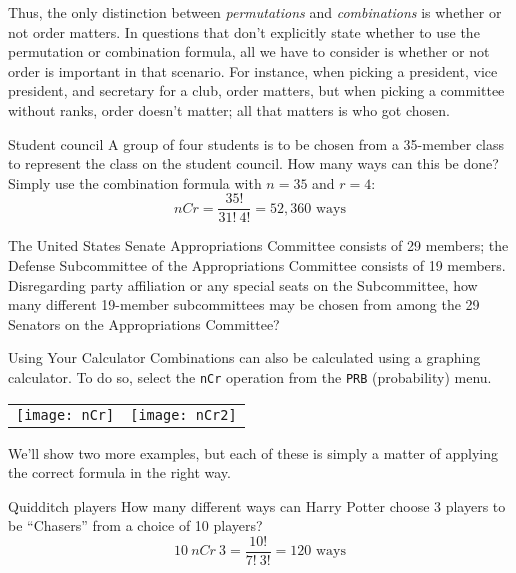 Thus, the only distinction between \emph{permutations} and \emph{combinations} is whether or not order matters.  In questions that don't explicitly state whether to use the permutation or combination formula, all we have to consider is whether or not order is important in that scenario.  For instance, when picking a president, vice president, and secretary for a club, order matters, but when picking a committee without ranks, order doesn't matter; all that matters is who got chosen.
\vfill
\pagebreak

\begin{example}[https://www.youtube.com/watch?v=ybwqsaiFgA8]{Student council}
A group of four students is to be chosen from a 35-member class to represent the class on the student council. How many ways can this be done?\\

\sol
Simply use the combination formula with $n=35$ and $r=4$:
\[nCr = \dfrac{35!}{31! \ 4!} = 52,360 \textrm{ ways}\]
\end{example}

\begin{try}
The United States Senate Appropriations Committee consists of 29 members; the Defense Subcommittee of the Appropriations Committee consists of 19 members. Disregarding party affiliation or any special seats on the Subcommittee, how many different 19-member subcommittees may be chosen from among the 29 Senators on the Appropriations Committee?
\end{try}

\begin{proc}{Using Your Calculator}
Combinations can also be calculated using a graphing calculator.  To do so, select the \verb|nCr| operation from the \verb|PRB| (probability) menu.

\begin{center}
\begin{tabular}{c c}
\texttt{[image: nCr]} & \hspace{0.5in} \texttt{[image: nCr2]}
\end{tabular}
\end{center}
\end{proc}

We'll show two more examples, but each of these is simply a matter of applying the correct formula in the right way.

\begin{example}[https://www.youtube.com/watch?v=KQVo1KwtF1c]{Quidditch players}
How many different ways can Harry Potter choose 3 players to be ``Chasers''
from a choice of 10 players?\\

\sol
\[10\ nCr\ 3 = \dfrac{10!}{7! \ 3!} = 120 \textrm{ ways}\]
\end{example}

